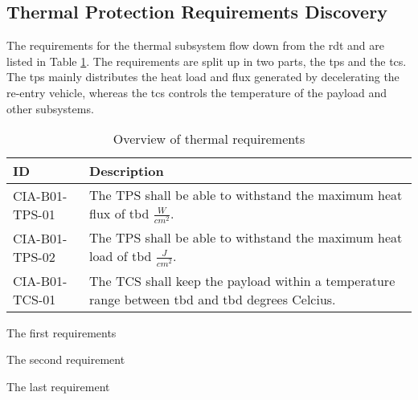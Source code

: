 \subsection{Thermal Protection Requirements Discovery} \label{sec:therm}
The requirements for the thermal subsystem flow down from the \gls{rdt} and are listed in Table \ref{tab:thermalreq}. The requirements are split up in two parts, the \gls{tps} and the \gls{tcs}. The \gls{tps} mainly distributes the heat load and flux generated by decelerating the re-entry vehicle, whereas the \gls{tcs} controls the temperature of the payload and other subsystems.


\begin{table}[H]
	\caption{Overview of thermal requirements}
	\begin{tabular}{|p{}|p{}|}
    \hline
    ID          & Description                                                                                                      \\ \hline \hline
    CIA-B01-TPS-01 & The TPS shall be able to withstand the maximum heat flux of \gls{tbd} $ \frac{W}{cm^2} $.               
\\ \hline
    CIA-B01-TPS-02 &  The TPS shall be able to withstand the maximum heat load of \gls{tbd} $ \frac{J}{cm^2} $.                
\\ \hline
    CIA-B01-TCS-01 & The TCS shall keep the payload within a temperature range between \gls{tbd} and \gls{tbd} degrees Celcius.                                            
\\ \hline
    \end{tabular}
    \label{tab:thermalreq}
\end{table}

The first requirements 

The second requirement

The last requirement